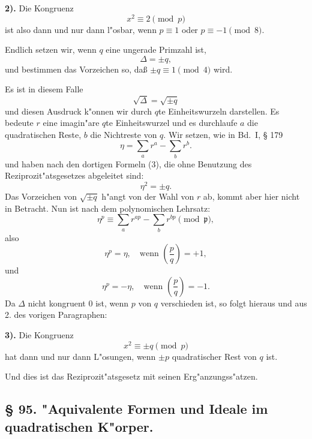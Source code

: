 \documentclass[12pt,a4paper]{article}
\theoremstyle{plain}
\begin{document}
\textbf{2).} Die Kongruenz
\[
x^2 \equiv 2 \pmod{p}
\]
ist also dann und nur dann l"osbar, wenn $p \equiv 1$ oder $p \equiv -1 \pmod{8}$.

Endlich setzen wir, wenn $q$ eine ungerade Primzahl ist,
\[
\Delta = \pm q,
\]
und bestimmen das Vorzeichen so, da\ss{} $\pm q \equiv 1 \pmod{4}$ wird.

Es ist in diesem Falle
\[
\sqrt{\Delta} = \sqrt{\pm q}
\]
und diesen Ausdruck k"onnen wir durch $q$te Einheitswurzeln darstellen. Es bedeute $r$ eine imagin"are $q$te Einheitswurzel und es durchlaufe $a$ die quadratischen Reste, $b$ die Nichtreste von $q$. Wir setzen, wie in Bd.~I, \S{} 179
\begin{equation}
\eta = \sum_{a} r^a - \sum_{b} r^b.
\tag{4}
\end{equation}
und haben nach den dortigen Formeln (3), die ohne Benutzung des Reziprozit"atsgesetzes abgeleitet sind:
\begin{equation}
\eta^2 = \pm q.
\tag{5}
\end{equation}
Das Vorzeichen von $\sqrt{\pm q}$ h"angt von der Wahl von $r$ ab, kommt aber hier nicht in Betracht. Nun ist nach dem polynomischen Lehrsatz:
\[
\eta^p \equiv \sum_{a} r^{ap} - \sum_{b} r^{bp} \pmod{\mathfrak{p}},
\]
also
\[
\eta^p = \eta,\quad \text{wenn } \left(\frac{p}{q}\right) = +1,
\]
und
\[
\eta^p = -\eta,\quad \text{wenn } \left(\frac{p}{q}\right) = -1.
\]
Da $\Delta$ nicht kongruent 0 ist, wenn $p$ von $q$ verschieden ist, so folgt hieraus und aus 2. des vorigen Paragraphen:

\textbf{3).} Die Kongruenz
\[
x^2 \equiv \pm q \pmod{p}
\]
hat dann und nur dann L"osungen, wenn $\pm p$ quadratischer Rest von $q$ ist.

Und dies ist das Reziprozit"atsgesetz mit seinen Erg"anzungss"atzen.

\subsection*{\S{} 95. "Aquivalente Formen und Ideale im quadratischen K"orper.}
\end{document}
